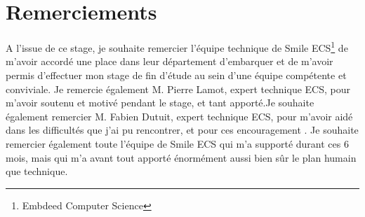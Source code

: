 \chapter*{Remerciements}
  A l'issue de ce stage, je souhaite remercier l'équipe technique de Smile ECS\footnote{Embdeed Computer Science} de m'avoir accordé une place dans leur département d'embarquer et de m'avoir permis d'effectuer mon stage de fin d'étude au sein d'une équipe compétente et conviviale. Je remercie également M. Pierre Lamot, expert technique ECS, pour m'avoir soutenu et motivé pendant le stage, et tant apporté.Je souhaite également remercier M. Fabien Dutuit, expert technique ECS, pour m'avoir aidé dans les difficultés que j'ai pu rencontrer, et pour ces encouragement . Je souhaite remercier également toute l'équipe de Smile ECS qui m'a supporté durant ces 6 mois, mais qui m'a avant tout apporté énormément aussi bien sûr le plan humain que technique.

